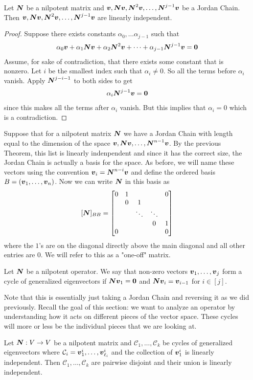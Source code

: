 \begin{theorem}
    Let $\boldsymbol{N}$ be a nilpotent matrix and $\boldsymbol{v},\boldsymbol{N}\boldsymbol{v},\boldsymbol{N}^2\boldsymbol{v},\dots,\boldsymbol{N}^{j-1}\boldsymbol{v}$ be a Jordan Chain. Then $\boldsymbol{v},\boldsymbol{N}\boldsymbol{v},\boldsymbol{N}^2\boldsymbol{v},\dots,\boldsymbol{N}^{j-1}\boldsymbol{v}$ are linearly independent.
\end{theorem}

\begin{proof}
    Suppose there exists constants $\alpha_0,\dots\alpha_{j-1}$ such that
    \[\alpha_0\boldsymbol{v}+\alpha_1\boldsymbol{N}\boldsymbol{v}+\alpha_2\boldsymbol{N}^2\boldsymbol{v}+\dots+\alpha_{j-1}\boldsymbol{N}^{j-1}\boldsymbol{v}=\boldsymbol{0}
    \]
    Assume, for sake of contradiction, that there exists some constant that is nonzero. Let $i$ be the smallest index such that $\alpha_i\neq 0$. So all the terms before $\alpha_i$ vanish. Apply $\boldsymbol{N}^{j-i-1}$ to both sides to get
    \[
    \alpha_{i}\boldsymbol{N}^{j-1}\boldsymbol{v}=\boldsymbol{0}
    \]
    since this makes all the terms after $\alpha_i$ vanish. But this implies that $\alpha_i=0$ which is a contradiction.
\end{proof}
Suppose that for a nilpotent matrix $\boldsymbol{N}$ we have a Jordan Chain with length equal to the dimension of the space $\boldsymbol{v}, \boldsymbol{N}\boldsymbol{v},\dots,\boldsymbol{N}^{n-1}\boldsymbol{v}$. By the previous Theorem, this list is linearly indenpendent and since it has the correct size,  the Jordan Chain is actually a basis for the space. As before, we will name these vectors using the convention $\boldsymbol{v}_i=\boldsymbol{N}^{n-i}\boldsymbol{v}$ and define the ordered basis $B=(\boldsymbol{v}_1,\dots,\boldsymbol{v}_{n})$. Now we can write $\boldsymbol{N}$ in this basis as
\[
[\boldsymbol{N}]_{BB}=\begin{bmatrix}
     0 & 1 & & & 0\\
     & 0 & 1 & & \\
     & & \ddots& \ddots & \\
     & & & 0 & 1 \\
     0 & & & & 0
\end{bmatrix}
\]
where the $1$'s are on the diagonal directly above the main diagonal and all other entries are $0$. We will refer to this as a "one-off" matrix.
\begin{definition}
    Let $\boldsymbol{N}$ be a nilpotent operator. We say that non-zero vectors $\boldsymbol{v}_1,\dots,\boldsymbol{v}_j$ form a cycle of generalized eigenvectors if $\boldsymbol{N}\boldsymbol{v}_1=\boldsymbol{0}$ and $\boldsymbol{N}\boldsymbol{v}_i=\boldsymbol{v}_{i-1}$ for $i\in[j]$.
\end{definition}
Note that this is essentially just taking a Jordan Chain and reversing it as we did previously. Recall the goal of this section: we want to analyze an operator by understanding how it acts on different pieces of the vector space. These cycles will more or less be the individual pieces that we are looking at.
\begin{theorem}
    Let $\boldsymbol{N}:V\to V$ be a nilpotent matrix and $\mathcal{C}_1,\dots,\mathcal{C}_k$ be cycles of generalized eigenvectors where $\mathcal{C}_i=\boldsymbol{v}_1^i,\dots,\boldsymbol{v}_{\ell_i}^i$ and the collection of $\boldsymbol{v}^i_1$ is linearly independent. Then $\mathcal{C}_1,\dots,\mathcal{C}_k$ are pairwise disjoint and their union is linearly independent.
\end{theorem}

